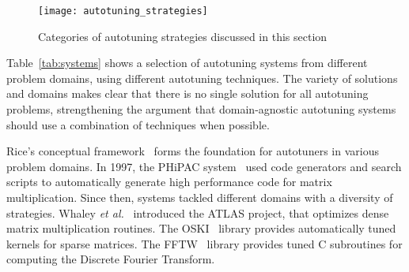 \begin{figure}[htpb]
    \centering
    \texttt{[image: autotuning\_strategies]}
    \caption{Categories of autotuning strategies discussed in this section}
    \label{fig:strategies}
\end{figure}

Table~\ref{tab:systems} shows a selection of autotuning systems from different
problem domains, using different autotuning techniques. The variety of solutions
and domains makes clear that there is no single solution for all autotuning
problems, strengthening the argument that domain-agnostic autotuning systems
should use a combination of techniques when possible.

Rice's conceptual framework~\cite{rice1976algorithm} forms the foundation for
autotuners in various problem domains.  In 1997, the PHiPAC
system~\cite{bilmes1997optimizing} used code generators and search scripts to
automatically generate high performance code for matrix multiplication. Since
then, systems tackled different domains with a diversity of strategies. Whaley
\emph{et al.}~\cite{dongarra1998automatically} introduced the ATLAS project,
that optimizes dense matrix multiplication routines. The
OSKI~\cite{vuduc2005oski} library provides automatically tuned kernels for
sparse matrices. The FFTW~\cite{frigo1998fftw} library provides tuned C
subroutines for computing the Discrete Fourier Transform.

